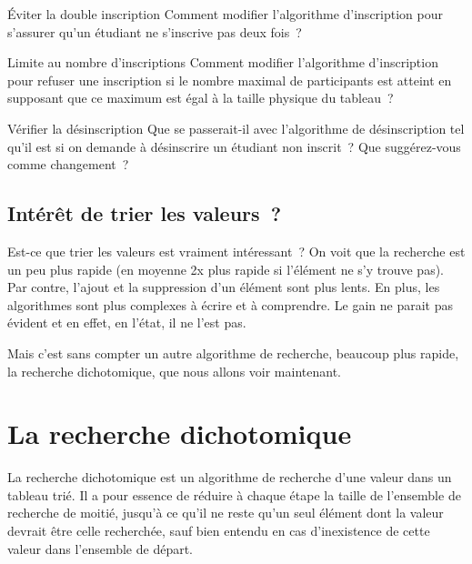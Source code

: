 			\begin{Exercice}{Éviter la double inscription}
				Comment modifier l’algorithme d’inscription
				pour s’assurer qu’un étudiant ne s’inscrive pas deux fois~?
			\end{Exercice}

			\begin{Exercice}{Limite au nombre d’inscriptions}
				Comment modifier l’algorithme d’inscription
				pour refuser une inscription si le nombre maximal
				de participants est atteint
				en supposant que ce maximum est égal à la taille physique du tableau~?
			\end{Exercice}

			\begin{Exercice}{Vérifier la désinscription}
				Que se passerait-il avec l’algorithme
				de désinscription tel qu’il est
				si on demande à désinscrire un étudiant non inscrit~?
				Que suggérez-vous comme changement~?
			\end{Exercice}

		\subsection{Intérêt de trier les valeurs~?}

			Est-ce que trier les valeurs est vraiment intéressant~?
			On voit que la recherche est un peu plus rapide
			(en moyenne 2x plus rapide si l’élément ne s’y trouve pas).
			Par contre, l’ajout et la suppression d’un élément
			sont plus lents.
			En plus, les algorithmes sont plus complexes à écrire
			et à comprendre.
			Le gain ne parait pas évident
			et en effet, en l’état, il ne l’est pas.
			
			Mais c’est sans compter 
			un autre algorithme de recherche, beaucoup plus rapide,
			la recherche dichotomique, que nous allons voir maintenant.
			
	\section{La recherche dichotomique} 

		La recherche dichotomique 
		est un algorithme de recherche d’une valeur dans un tableau trié.
		Il a pour essence de réduire à chaque étape 
		la taille de l’ensemble de recherche de moitié, 
		jusqu’à ce qu’il ne reste qu’un seul élément 
		dont la valeur devrait être celle recherchée, 
		sauf bien entendu en cas d’inexistence de cette valeur 
		dans l’ensemble de départ. 
	
